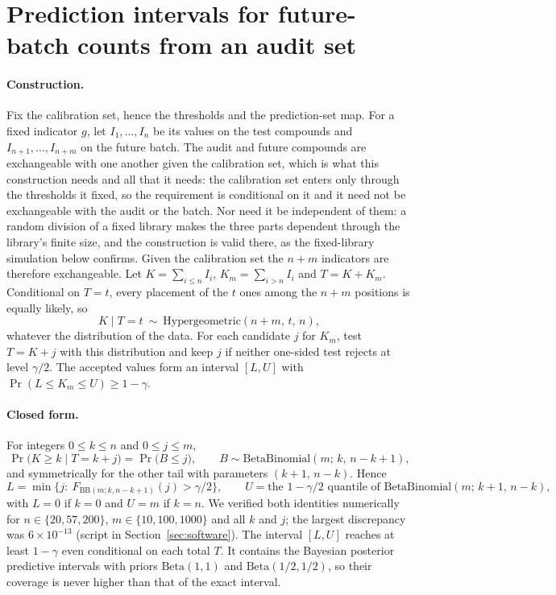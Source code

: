 \documentclass[10pt]{article}
\begin{document}
\section{Prediction intervals for future-batch counts from an audit set}
\label{sec:intervals}

\paragraph{Construction.} Fix the calibration set, hence the thresholds and the prediction-set map. For a fixed indicator $g$, let $I_1,\dots,I_n$ be its values on the test compounds and $I_{n+1},\dots,I_{n+m}$ on the future batch. The audit and future compounds are exchangeable with one another given the calibration set, which is what this construction needs and all that it needs: the calibration set enters only through the thresholds it fixed, so the requirement is conditional on it and it need not be exchangeable with the audit or the batch. Nor need it be independent of them: a random division of a fixed library makes the three parts dependent through the library's finite size, and the construction is valid there, as the fixed-library simulation below confirms. Given the calibration set the $n+m$ indicators are therefore exchangeable. Let $K=\sum_{i\le n}I_i$, $K_m=\sum_{i>n}I_i$ and $T=K+K_m$. Conditional on $T=t$, every placement of the $t$ ones among the $n+m$ positions is equally likely, so
\begin{equation}
K\mid T=t\ \sim\ \mathrm{Hypergeometric}(n+m,\,t,\,n),
\end{equation}
whatever the distribution of the data. For each candidate $j$ for $K_m$, test $T=K+j$ with this distribution and keep $j$ if neither one-sided test rejects at level $\gamma/2$. The accepted values form an interval $[L,U]$ with $\Pr(L\le K_m\le U)\ge1-\gamma$.

\paragraph{Closed form.} For integers $0\le k\le n$ and $0\le j\le m$,
\begin{equation}
\Pr\big(K\ge k\mid T=k+j\big)=\Pr\big(B\le j\big),\qquad B\sim\mathrm{BetaBinomial}(m;\,k,\,n-k+1),
\end{equation}
and symmetrically for the other tail with parameters $(k+1,\,n-k)$.\citep{Thatcher1964} Hence
\begin{equation}
L=\min\{j:\ F_{\mathrm{BB}(m;k,n-k+1)}(j)>\gamma/2\},\qquad
U=\text{the }1-\gamma/2\text{ quantile of }\mathrm{BetaBinomial}(m;\,k+1,\,n-k),
\end{equation}
with $L=0$ if $k=0$ and $U=m$ if $k=n$. We verified both identities numerically for $n\in\{20,57,200\}$, $m\in\{10,100,1000\}$ and all $k$ and $j$; the largest discrepancy was $6\times10^{-13}$ (script in Section~\ref{sec:software}). The interval $[L,U]$ reaches at least $1-\gamma$ even conditional on each total $T$. It contains the Bayesian posterior predictive intervals with priors $\mathrm{Beta}(1,1)$ and $\mathrm{Beta}(1/2,1/2)$, so their coverage is never higher than that of the exact interval.
\end{document}
